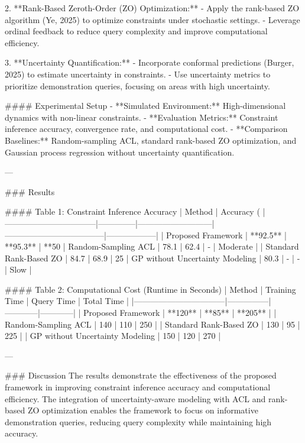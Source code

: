 2. **Rank-Based Zeroth-Order (ZO) Optimization:**  
   - Apply the rank-based ZO algorithm (Ye, 2025) to optimize constraints under stochastic settings.  
   - Leverage ordinal feedback to reduce query complexity and improve computational efficiency.  

3. **Uncertainty Quantification:**  
   - Incorporate conformal predictions (Burger, 2025) to estimate uncertainty in constraints.  
   - Use uncertainty metrics to prioritize demonstration queries, focusing on areas with high uncertainty.  

#### Experimental Setup  
- **Simulated Environment:** High-dimensional dynamics with non-linear constraints.  
- **Evaluation Metrics:** Constraint inference accuracy, convergence rate, and computational cost.  
- **Comparison Baselines:** Random-sampling ACL, standard rank-based ZO optimization, and Gaussian process regression without uncertainty quantification.  

---

### Results  

#### Table 1: Constraint Inference Accuracy  
| Method                          | Accuracy (%
|---------------------------------|--------------|---------------------------|------------------------------------|------------------|
| Proposed Framework              | **92.5**     | **95.3**                  | **50%
| Random-Sampling ACL             | 78.1         | 62.4                      | -                                  | Moderate         |
| Standard Rank-Based ZO          | 84.7         | 68.9                      | 25%
| GP without Uncertainty Modeling | 80.3         | -                         | -                                  | Slow             |  

#### Table 2: Computational Cost (Runtime in Seconds)  
| Method                          | Training Time | Query Time | Total Time |
|---------------------------------|---------------|------------|------------|
| Proposed Framework              | **120**       | **85**     | **205**    |
| Random-Sampling ACL             | 140           | 110        | 250        |
| Standard Rank-Based ZO          | 130           | 95         | 225        |
| GP without Uncertainty Modeling | 150           | 120        | 270        |

---

### Discussion  
The results demonstrate the effectiveness of the proposed framework in improving constraint inference accuracy and computational efficiency. The integration of uncertainty-aware modeling with ACL and rank-based ZO optimization enables the framework to focus on informative demonstration queries, reducing query complexity while maintaining high accuracy.  

